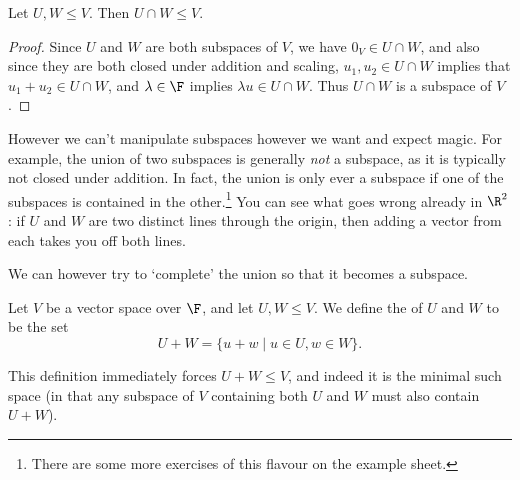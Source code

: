 \begin{proposition}
    Let $U, W \leq V$. Then $U \cap W \leq V$.
\end{proposition}
\begin{proof}
    Since $U$ and $W$ are both subspaces of $V$, we have $0_V \in U \cap W$, and also since they are both closed under addition and scaling, $u_1, u_2 \in U \cap W$ implies that $u_1 + u_2 \in U \cap W$, and $\lambda \in \F$ implies $\lambda u \in U\cap W$. Thus $U \cap W$ is a subspace of $V$. 
\end{proof}

However we can't manipulate subspaces however we want and expect magic. For example, the union of two subspaces is generally \emph{not} a subspace, as it is typically not closed under addition. In fact, the union is only ever a subspace if one of the subspaces is contained in the other.\footnote{There are some more exercises of this flavour on the example sheet.}
You can see what goes wrong already in $\R^2$: if $U$ and $W$ are two distinct lines through the origin, then adding a vector from each takes you off both lines.
\begin{center}
\end{center}
We can however try to `complete' the union so that it becomes a subspace.

\begin{definition}
    Let $V$ be a vector space over $\F$, and let $U, W \leq V$. We define the  of $U$ and $W$ to be the set
    $$
    U + W = \{u + w \mid u \in U, w \in W \}.
    $$
\end{definition}

This definition immediately forces $U + W \leq V$, and indeed it is the minimal such space (in that any subspace of $V$ containing both $U$ and $W$ must also contain $U + W$).


